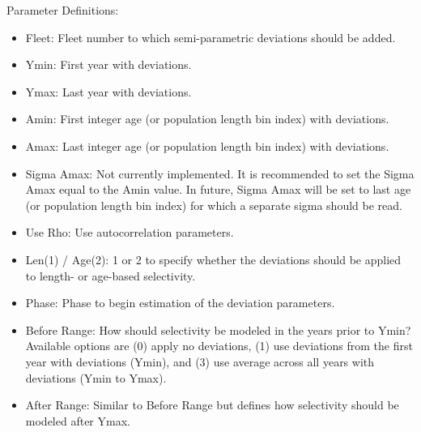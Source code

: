 Parameter Definitions:
\begin{itemize}
	\item Fleet: Fleet number to which semi-parametric deviations should be added.
	\item Ymin: First year with deviations.
	\item Ymax: Last year with deviations.
	\item Amin: First integer age (or population length bin index) with deviations.
	\item Amax: Last integer age (or population length bin index) with deviations.
	\item Sigma Amax: Not currently implemented. It is recommended to set the Sigma Amax equal to the Amin value. In future, Sigma Amax will be set to last age (or population length bin index) for which a separate sigma should be read.
	\item Use Rho: Use autocorrelation parameters.
	\item Len(1) / Age(2): 1 or 2 to specify whether the deviations should be applied to length- or age-based selectivity.
	\item Phase: Phase to begin estimation of the deviation parameters.
	\item Before Range: How should selectivity be modeled in the years prior to Ymin? Available options are (0) apply no deviations, (1) use deviations from the first year with deviations (Ymin), and (3) use average across all years with deviations (Ymin to Ymax).
	\item After Range: Similar to Before Range but defines how selectivity should be modeled after Ymax.
\end{itemize}

